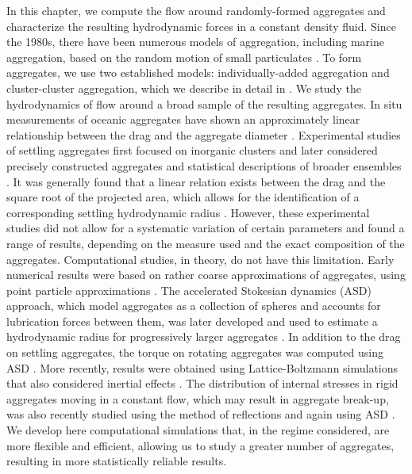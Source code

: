 In this chapter, we compute	the flow around randomly-formed aggregates and 
characterize the resulting  hydrodynamic forces in a constant density fluid.
Since the 1980s, there have been numerous models of aggregation, including marine aggregation, based on the random motion of small particulates 
\cite{rosenstock_cluster_1980, witten_diffusion-limited_1981,witten_tenuous_1986,kolb_anisotropic_1987}. To form aggregates, we use two established models: individually-added aggregation and cluster-cluster aggregation, which we describe in detail in \cite{yoo_hydrodynamic_2020}. 
We  study the hydrodynamics of flow around a broad sample of the resulting aggregates.
In situ measurements of oceanic aggregates have shown an approximately linear relationship between the drag and the aggregate diameter \cite{alldredge_situ_1988}. Experimental studies of settling aggregates first focused on inorganic clusters \cite{wiltzius_hydrodynamic_1987} and later considered precisely constructed aggregates \cite{takayasu_determination_1998} and statistical descriptions of broader ensembles \cite{johnson_settling_1996}. 
It was generally found that a linear relation exists  between the drag and the square root of the projected area, which allows for the identification of a corresponding settling hydrodynamic radius \cite{johnson_settling_1996, tang_model_2002}.
However, these experimental studies did not allow for a systematic variation of certain parameters and  found a range of results, depending on the measure used and the exact composition of the aggregates.  Computational studies, in theory, do not have this limitation. Early numerical results were based on rather coarse approximations of aggregates, using point particle approximations \cite{chen_translational_1984}. The accelerated Stokesian dynamics (ASD) approach, which model aggregates as a collection of spheres and accounts for lubrication forces between them, was later developed \cite{brady_stokesian_1988} and used to estimate a hydrodynamic radius for progressively larger aggregates \cite{rogak_stokes_1990,bossis_hydrodynamic_1991}.
In addition to the drag on settling aggregates, the torque on rotating aggregates 
was computed using ASD \cite{binder_structural_2009}. More recently, results were obtained using Lattice-Boltzmann simulations that also considered inertial effects \cite{zhang_direct_2015}. The distribution of internal stresses in rigid aggregates moving in a constant flow, which may result in aggregate break-up, was also recently studied using the method of reflections  \cite{gastaldi_distribution_2011} and again using ASD  \cite{vanni_accurate_2015}. We develop here 
computational simulations that, in the regime considered, are more flexible and efficient, allowing us to study a greater number of aggregates, resulting in more statistically reliable results. 


